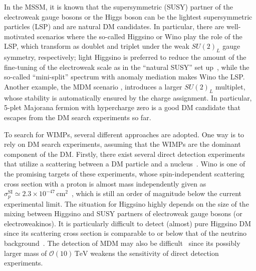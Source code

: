 \documentclass[12pt,twoside,book]{article}
\begin{document}
In the MSSM, it is known that the supersymmetric (SUSY) partner of the electroweak gauge bosons or the Higgs boson can be the lightest supersymmetric particles (LSP) and are natural DM candidates.
In particular, there are well-motivated scenarios where the so-called Higgsino or Wino play the role of the LSP, which transform as doublet and triplet under the weak $SU(2)_L$ gauge symmetry, respectively; light Higgsino is preferred to reduce the amount of the fine-tuning of the electroweak scale as in the ``natural SUSY'' set up~\cite{Kitano:2005wc, Brust:2011tb, Papucci:2011wy, Baer:2012uy}, while the so-called ``mini-split'' spectrum \cite{Wells:2003tf, Wells:2004di, ArkaniHamed:2004fb, Giudice:2004tc, ArkaniHamed:2004yi, ArkaniHamed:2005yv} with anomaly mediation \cite{Randall:1998uk, Giudice:1998xp} makes Wino the LSP.
Another example, the MDM scenario \cite{Cirelli:2005uq, Cirelli:2007xd, Cirelli:2009uv}, introduces a larger $SU(2)_L$ multiplet, whose stability is automatically ensured by the charge assignment.
In particular, 5-plet Majorana fermion with hypercharge zero is a good DM candidate that escapes from the DM search experiments so far.

To search for WIMPs, several different approaches are adopted.
One way is to rely on DM search experiments, assuming that the WIMPs are the dominant component of the DM.
Firstly, there exist several direct detection experiments that utilize a scattering between a DM particle and a nucleus~\cite{Akerib:2016vxi, Cui:2017nnn, Aprile:2018dbl}.
Wino is one of the promising targets of these experiments, whose spin-independent scattering cross section with a proton is almost mass independently given as $\sigma_p^{\mathrm{SI}} \simeq 2.3 \times 10^{-47}\,\mathrm{cm}^2$~\cite{Hisano:2010fy, Hisano:2012wm, Hisano:2015rsa, Hill:2011be, Hill:2013hoa}, which is still an order of magnitude below the current experimental limit.
The situation for Higgsino highly depends on the size of the mixing between Higgsino and SUSY partners of electroweak gauge bosons (or electroweakinos).
It is particularly difficult to detect (almost) pure Higgsino DM since its scattering cross section is comparable to or below that of the neutrino background~\cite{Hisano:2012wm}.
The detection of MDM may also be difficult~\cite{Hisano:2011cs} since its possibly larger mass of $\mathcal{O} (10)\,\mathrm{TeV}$ weakens the sensitivity of direct detection experiments.
\end{document}
